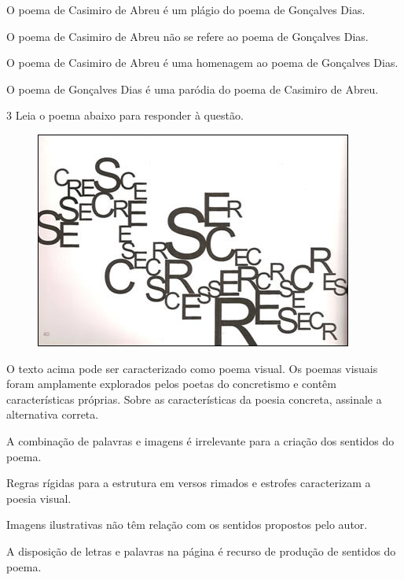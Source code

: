 \begin{escolha}

  \item O poema de Casimiro de Abreu é um plágio do poema de Gonçalves Dias.

  \item O poema de Casimiro de Abreu não se refere ao poema de Gonçalves Dias.

  \item O poema de Casimiro de Abreu é uma homenagem ao poema de Gonçalves Dias.

  \item O poema de Gonçalves Dias é uma paródia do poema de Casimiro de Abreu.

\end{escolha}

\num{3} Leia o poema abaixo para responder à questão.

\begin{figure}[htpb!]
\centering
\includegraphics[width=\textwidth]{./imgSAEB_7_POR/media/image3.png}
\end{figure}


O texto acima pode ser caracterizado como poema visual. Os poemas visuais
foram amplamente explorados pelos poetas do concretismo e contêm
características próprias. Sobre as características da poesia concreta,
assinale a alternativa correta.

\begin{escolha}

  \item A combinação de palavras e imagens é irrelevante para a criação dos sentidos do poema. 

  \item Regras rígidas para a estrutura em versos rimados e estrofes caracterizam a poesia visual.

  \item Imagens ilustrativas não têm relação com os sentidos propostos pelo autor.

  \item A disposição de letras e palavras na página é recurso de produção de sentidos do poema.

\end{escolha}

